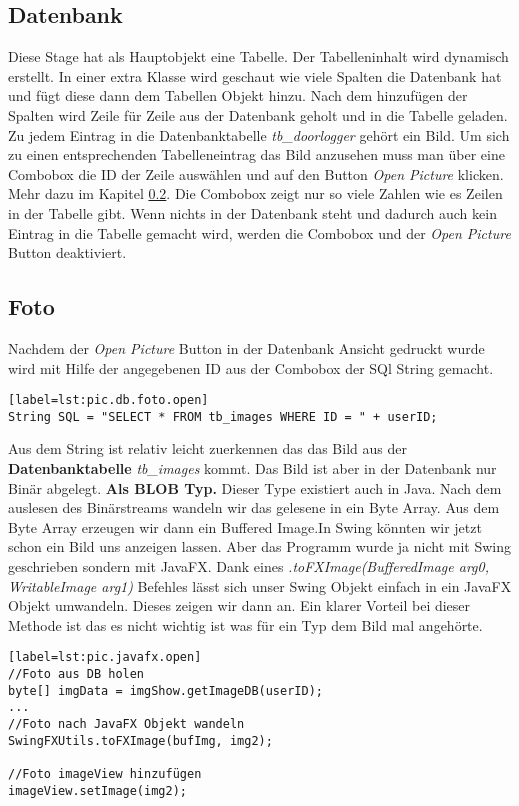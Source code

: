 \subsection{Datenbank}
\label{subsec.datenbank}
Diese Stage hat als Hauptobjekt eine Tabelle. Der Tabelleninhalt wird dynamisch erstellt. In einer extra Klasse wird geschaut wie viele Spalten die Datenbank hat und fügt diese dann dem Tabellen Objekt hinzu. Nach dem hinzufügen der Spalten wird Zeile für Zeile aus der Datenbank geholt und in die Tabelle geladen. Zu jedem Eintrag in die Datenbanktabelle \textit{tb\_doorlogger} gehört ein Bild. Um sich zu einen entsprechenden Tabelleneintrag das Bild anzusehen muss man über eine Combobox die ID der Zeile auswählen und auf den Button \textit{Open Picture} klicken. Mehr dazu im Kapitel \ref{subsec.foto}. Die Combobox zeigt nur so viele Zahlen wie es Zeilen in der Tabelle gibt. Wenn nichts in der Datenbank steht und dadurch auch kein Eintrag in die Tabelle gemacht wird, werden die Combobox und der \textit{Open Picture} Button deaktiviert.

\subsection{Foto}
\label{subsec.foto}
Nachdem der \textit{Open Picture} Button in der Datenbank Ansicht gedruckt wurde wird mit Hilfe der angegebenen ID aus der Combobox der SQl String gemacht.

\begin{lstlisting}[caption={Java-SQL String Foto öffnen},captionpos=b][label=lst:pic.db.foto.open]
String SQL = "SELECT * FROM tb_images WHERE ID = " + userID;
\end{lstlisting}

Aus dem String ist relativ leicht zuerkennen das das Bild aus der \textbf{Datenbanktabelle} \textit{tb\_images} kommt. Das Bild ist aber in der Datenbank nur Binär abgelegt. \textbf{Als BLOB Typ.} Dieser Type existiert auch in Java. Nach dem auslesen des Binärstreams wandeln wir das gelesene in ein Byte Array. Aus dem Byte Array erzeugen wir dann ein Buffered Image.In Swing könnten wir jetzt schon ein Bild uns anzeigen lassen. Aber das Programm wurde ja nicht mit Swing geschrieben sondern mit JavaFX. Dank eines \textit{.toFXImage(BufferedImage arg0, WritableImage arg1)} Befehles lässt sich unser Swing Objekt einfach in ein JavaFX Objekt umwandeln. Dieses zeigen wir dann an. Ein klarer Vorteil bei dieser Methode ist das es nicht wichtig ist was für ein Typ dem Bild mal angehörte.
\begin{lstlisting}[caption={JavaFX Foto öffnen},captionpos=b][label=lst:pic.javafx.open]
//Foto aus DB holen
byte[] imgData = imgShow.getImageDB(userID);
...
//Foto nach JavaFX Objekt wandeln
SwingFXUtils.toFXImage(bufImg, img2);

//Foto imageView hinzufügen
imageView.setImage(img2);
\end{lstlisting}